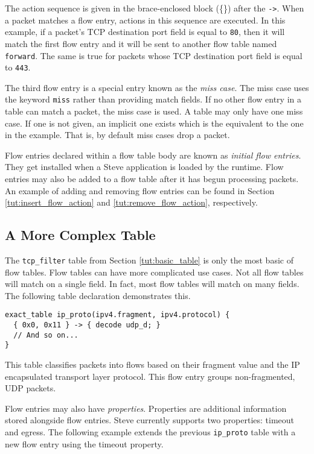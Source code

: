 The action sequence is given in the brace-enclosed block (\{\}) after the \texttt{->}. When a packet matches a flow entry, actions in this
sequence are executed.
In this example, if a packet's TCP destination port field is equal to \texttt{80},
then it will match the first flow entry and it will be sent to another flow table
named \texttt{forward}. The same is true for packets whose TCP destination
port field is equal to \texttt{443}.

The third flow entry is a special entry known as the \textit{miss case}. The miss 
case uses the keyword \texttt{miss} rather than providing match fields. If no 
other flow entry in a table can match a packet, the miss case is used. A table 
may only have one miss case. If one is not given, an implicit one exists which 
is the equivalent to the one in the example. That is, by default 
miss cases drop a packet.

Flow entries declared within a flow table body are known
as \textit{initial flow entries}. 
They get installed when a Steve application is loaded by the runtime.
Flow entries may also be added to a flow table after it has begun processing packets. 
An example of adding and removing flow entries can be found in Section \ref{tut:insert_flow_action} and \ref{tut:remove_flow_action}, respectively.

\subsection{A More Complex Table} \label{tut:complex_table}

The \texttt{tcp\_filter} table from Section \ref{tut:basic_table} is only the most basic of flow tables. 
Flow tables can have more complicated use cases.
Not all flow tables will match on a single field. In fact, most flow tables will
match on many fields. The following table declaration demonstrates this.

\begin{lstlisting}
exact_table ip_proto(ipv4.fragment, ipv4.protocol) {
  { 0x0, 0x11 } -> { decode udp_d; }
  // And so on...
}
\end{lstlisting}

This table classifies packets into flows based on their fragment value
and the IP encapsulated transport layer protocol. This flow entry
groups non-fragmented, UDP packets.

Flow entries may also have \textit{properties}. Properties are additional
information stored alongside flow entries. 
Steve currently supports two properties: timeout and egress.
The following example extends the previous \texttt{ip\_proto} table with a new flow entry using the timeout property.

